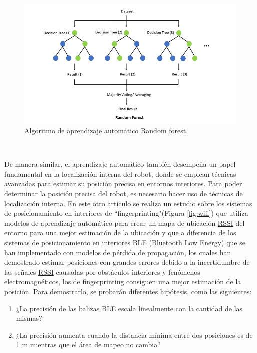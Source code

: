 \begin{figure} [H]
  \begin{center}
    \includegraphics[scale=0.8]{figs/random_forest}
  \end{center}
  \caption{Algoritmo de aprendizaje automático Random forest.}
  \label{fig:random_forest}
\end{figure}\

De manera similar, el aprendizaje automático también desempeña un papel fundamental en la localización interna del robot, donde se emplean técnicas avanzadas para estimar su posición precisa en entornos interiores. Para poder determinar la posición precisa del robot, es necesario hacer uso de técnicas de localización interna. En este otro artículo \cite{unknown} se realiza un estudio sobre los sistemas de posicionamiento en interiores de ``fingerprinting"(Figura \ref{fig:wifi}) que utiliza modelos de aprendizaje automático para crear un mapa de ubicación \hyperlink{RSSI}{RSSI} del entorno para una mejor estimación de la ubicación y que a diferencia de los sistemas de posicionamiento en interiores \hyperlink{BLE}{BLE} (Bluetooth Low Energy) que se han implementado con modelos de pérdida de propagación, los cuales han demostrado estimar posiciones con grandes errores debido a la incertidumbre de las señales \hyperlink{RSSI}{RSSI} causadas por obstáculos interiores y fenómenos electromagnéticos, los de fingerprinting consiguen una mejor estimación de la posición. Para demostrarlo, se probarán diferentes hipótesis, como las siguientes:

\begin{enumerate}
 \item ¿La precisión de las balizas \hyperlink{BLE}{BLE} escala linealmente con la cantidad de las mismas?
 \item ¿La precisión aumenta
cuando la distancia mínima entre dos posiciones es de 1 m mientras que el área de mapeo no cambia?
\end{enumerate}\ 

